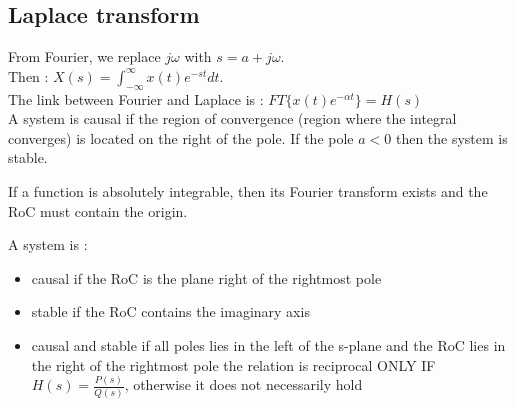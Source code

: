 \documentclass[../main.tex]{subfiles}
\begin{document}
\subsection{Laplace transform}
 From Fourier, we replace $j \omega$ with $s = a + j\omega$.\\
 Then : $X(s) = \int_{-\infty}^\infty x(t) e^{-st} dt$.\\
 The link between Fourier and Laplace is : $FT\{x(t) e^{-\alpha t}\} = H(s)$\\

 A system is causal if the region of convergence (region where the integral converges) is located on the right of the pole. If the pole $a<0$ then the system is stable.

If a function is absolutely integrable, then its Fourier transform exists and the RoC must contain the origin.

A system is :
\begin{itemize}
    \item causal if the RoC is the plane right of the rightmost pole
    \item stable if the RoC contains the imaginary axis
    \item causal and stable if all poles lies in the left of the s-plane and the RoC lies in the right of the rightmost pole \warning the relation is reciprocal ONLY IF $H(s) = \frac{P(s)}{Q(s)}$, otherwise it does not necessarily hold
\end{itemize}
\end{document}
